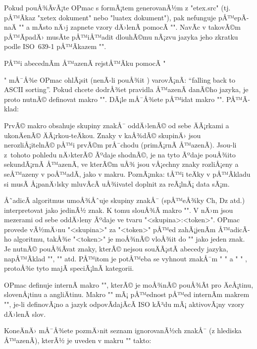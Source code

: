 Pokud pouÅ¾Ã­vÃ¡te OPmac s formÃ¡tem generovanÃ½m z "etex.src" (tj. pÅ™Ã­kaz 
"xetex dokument" nebo "luatex dokument"), pak nefunguje pÅ™epÃ­naÄ "\eslang" a
mÃ­sto nÄ›j zapnete vzory dÄ›lenÃ­ pomocÃ­ "".
NavÃ­c v takovÃ©m pÅ™Ã­padÄ› musÃ­te pÅ™iÅ™adit dlouhÃ©mu nÃ¡zvu jazyka jeho zkratku podle
ISO~639-1 pÅ™Ã­kazem "".

PÅ™i abecednÃ­m Å™azenÃ­ rejstÅ™Ã­ku pomocÃ­ "\makeindex" mÅ¯Å¾e OPmac ohlÃ¡sit
(nenÃ­-li pouÅ¾it \csplain) varovÃ¡nÃ­: ``falling back to ASCII sorting''.
Pokud chcete dodrÅ¾et pravidla Å™azenÃ­ danÃ©ho jazyka, je proto nutnÃ© definovat makro 
"". DÃ¡le mÅ¯Å¾ete pÅ™idat makro
"". PÅ™Ã­klad:

\begtt
\def\sortingdataes {aAÃ¤Ã„Ã¡Ã,bB,cCÃ§Ã‡,^^P^^Q^^R,dD,...,zZ,.}
\def\specsortingdataes {ch:^^P Ch:^^Q CH:^^R}
\endtt

PrvÃ© makro obsahuje skupiny znakÅ¯ oddÄ›lenÃ© od sebe ÄÃ¡rkami a ukonÄenÃ©
ÄÃ¡rkou-teÄkou. Znaky v kaÅ¾dÃ© skupinÄ› jsou nerozliÅ¡itelnÃ© pÅ™i prvÃ©m prÅ¯chodu
(primÃ¡rnÃ­ Å™azenÃ­). Jsou-li z~tohoto pohledu nÄ›kterÃ© Ãºdaje shodnÃ©, je na tyto
Ãºdaje pouÅ¾ito sekundÃ¡rnÃ­ Å™azenÃ­, ve kterÃ©m uÅ¾ jsou vÅ¡echny znaky rozliÅ¡eny a
seÅ™azeny v poÅ™adÃ­, jako v makru. PoznÃ¡mka: tÅ™i teÄky v pÅ™Ã­kladu si musÃ­ Å¡panÄ›lsky
mluvÃ­cÃ­ uÅ¾ivatel doplnit za reÃ¡lnÃ¡ data sÃ¡m.

Å˜adicÃ­ algoritmus umoÅ¾Åˆuje skupiny znakÅ¯ (spÅ™eÅ¾ky Ch, Dz atd.) interpretovat
jako jedinÃ½ znak. K tomu slouÅ¾Ã­ makro "". V nÄ›m
jsou mezerami od sebe oddÄ›leny Ãºdaje ve tvaru "<skupina>:<token>". OPmac
provede vÃ½mÄ›nu "<skupina>" za "<token>" pÅ™ed zahÃ¡jenÃ­m Å™adicÃ­ho algoritmu,
takÅ¾e "<token>" je moÅ¾nÃ© vloÅ¾it do "" jako jeden znak.
Je nutnÃ© pouÅ¾Ã­vat znaky, kterÃ© nejsou souÄÃ¡stÃ­ abecedy jazyka, napÅ™Ã­klad
"^^A", "^^B" atd. PÅ™itom je potÅ™eba se vyhnout znakÅ¯m "^^I" a "^^M" ,
protoÅ¾e tyto majÃ­ speciÃ¡lnÃ­ kategorii.

OPmac definuje internÃ­ makro "\sortingdata", kterÃ©
je moÅ¾nÃ© pouÅ¾Ã­t pro ÄeÅ¡tinu, slovenÅ¡tinu a angliÄtinu.
Makro "" mÃ¡ pÅ™ednost pÅ™ed internÃ­m makrem
"\sortingdata", je-li definovÃ¡no a jazyk odpovÃ­dajÃ­cÃ­ ISO kÃ³du mÃ¡
aktivovÃ¡ny vzory dÄ›lenÃ­ slov.

KoneÄnÄ› mÅ¯Å¾ete pozmÄ›nit seznam ignorovanÃ½ch znakÅ¯ (z hlediska Å™azenÃ­), kterÃ½
je uveden v makru "\setignoredchars" takto:

